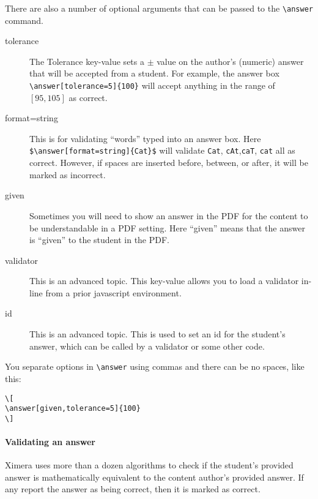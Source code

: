 \documentclass{ximera}
\begin{document}
There are also a number of optional arguments that can be passed
to the \verb|\answer| command.
\begin{description}
  \item[tolerance] The Tolerance key-value sets a $\pm$ value on the
    author's (numeric) answer that will be accepted from a student. For
    example,
    the answer box \verb|\answer[tolerance=5]{100}| will accept anything in
    the range of $[95,105]$ as correct.
  \item[format=string] This is for validating ``words'' typed into an answer
    box. Here
    \verb|$\answer[format=string]{Cat}$| will validate \verb!Cat!,
    \verb!cAt!,\verb!caT!, \verb!cat! all as
    correct. However, if spaces are inserted before, between, or after, it will
    be marked as incorrect.
  \item[given] Sometimes you will need to show an answer in the PDF for the
    content to be understandable in a PDF setting. Here ``given'' means that
    the
    answer is ``given'' to the student in the PDF.
  \item[validator] This is an advanced topic. This key-value allows you to load
    a validator in-line
    from a prior javascript environment.
  \item[id] This is an advanced topic. This is used to set an id for the
    student's answer, which can be
    called by a validator or some other code.
\end{description}

\begin{warning}
  You separate options in \verb!\answer! using commas and there can be no
  spaces, like this:
  \begin{verbatim}
\[
\answer[given,tolerance=5]{100}
\]
\end{verbatim}
\end{warning}

\paragraph{Validating an answer}

Ximera uses more than a dozen algorithms to check if the student's provided
answer is mathematically equivalent to the content author's provided answer. If
any report the answer as being correct, then it is marked as correct.
\end{document}
